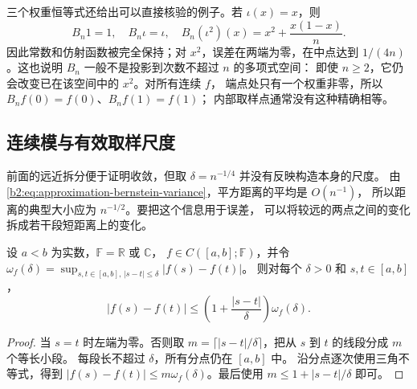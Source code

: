 三个权重恒等式还给出可以直接核验的例子。若 \(\iota(x)=x\)，则
\[
 B_n1=1,\quad B_n\iota=\iota,\quad
 B_n(\iota^2)(x)=x^2+\frac{x(1-x)}n.
\]
因此常数和仿射函数被完全保持；对 \(x^2\)，误差在两端为零，在中点达到
\(1/(4n)\)。这也说明 \(B_n\) 一般不是投影到次数不超过 \(n\) 的多项式空间：
即使 \(n\geq2\)，它仍会改变已在该空间中的 \(x^2\)。对所有连续 \(f\)，
端点处只有一个权重非零，所以 \(B_nf(0)=f(0)\)、\(B_nf(1)=f(1)\)；
内部取样点通常没有这种精确相等。

\subsection{连续模与有效取样尺度}
\label{b2:subsec:approximation-bernstein-rate}

前面的远近拆分便于证明收敛，但取 \(\delta=n^{-1/4}\) 并没有反映构造本身的尺度。
由\eqref{b2:eq:approximation-bernstein-variance}，平方距离的平均是 \(O(n^{-1})\)，
所以距离的典型大小应为 \(n^{-1/2}\)。要把这个信息用于误差，
可以将较远的两点之间的变化拆成若干段短距离上的变化。

\begin{lemma}[区间连续模的分段估计]
\label{b2:lem:approximation-modulus-subdivision}
设 \(a<b\) 为实数，\(\mathbb F=\mathbb R\) 或 \(\mathbb C\)，
\(f\in C([a,b];\mathbb F)\)，并令
\(\omega_f(\delta)=\sup_{s,t\in[a,b],\,|s-t|\leq\delta}|f(s)-f(t)|\)。
则对每个 \(\delta>0\) 和 \(s,t\in[a,b]\)，
\[
 |f(s)-f(t)|\leq\left(1+\frac{|s-t|}{\delta}\right)\omega_f(\delta).
\]
\end{lemma}
\begin{proof}
当 \(s=t\) 时左端为零。否则取
\(m=\lceil|s-t|/\delta\rceil\)，把从 \(s\) 到 \(t\) 的线段分成 \(m\) 个等长小段。
每段长不超过 \(\delta\)，所有分点仍在 \([a,b]\) 中。
沿分点逐次使用三角不等式，得到
\(|f(s)-f(t)|\leq m\omega_f(\delta)\)。最后使用
\(m\leq1+|s-t|/\delta\) 即可。
\end{proof}

